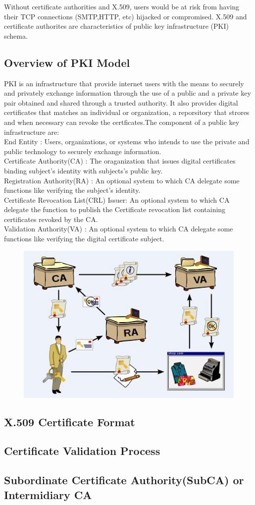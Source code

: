 Without certificate authorities and X.509, users would be at risk from having  their TCP connections (SMTP,HTTP, etc) hijacked or compromised. X.509 and certificate authorites are characteristics of public key infrastructure (PKI) schema.\\
\subsection{Overview of PKI Model}
PKI is an infrastructure that provide internet users with the means to securely and privately exchange information through the use of a public and a private key pair obtained and shared through a trusted authority. It also provides digital certificates that matches an individual or organization, a reporsitory that strores and when necessary can revoke the certficates.The component of a public key infrastructure are:\\
End Entity : \indent Users, organizations, or systems who intends to use the private and public technology to securely exchange information.\\
Certificate Authority(CA) : \indent  The oraganization that issues digital certificates binding subject's identity with subjects's public key.\\
Registration Authority(RA) : \indent An optional system to which CA delegate some functions like verifying the subject's identity.\\
Certificate Revocation List(CRL) Issuer: \indent An optional system to which CA delegate the function to publish the Certificate revocation list containing certificates revoked by the CA.\\
Validation Authority(VA) : \indent An optional system to which CA delegate some functions like verifying the digital certificate subject.\\

\begin{figure}[h]
\centering
\includegraphics[width=0.7\linewidth]{./figures/PKI_Introduction}
\caption[PKI Workflow]{}
\label{fig:PKI_Introduction}
\end{figure}

\subsection{X.509 Certificate Format}
\subsection{Certificate Validation Process}
\subsection{Subordinate Certificate Authority(SubCA) or Intermidiary CA}


